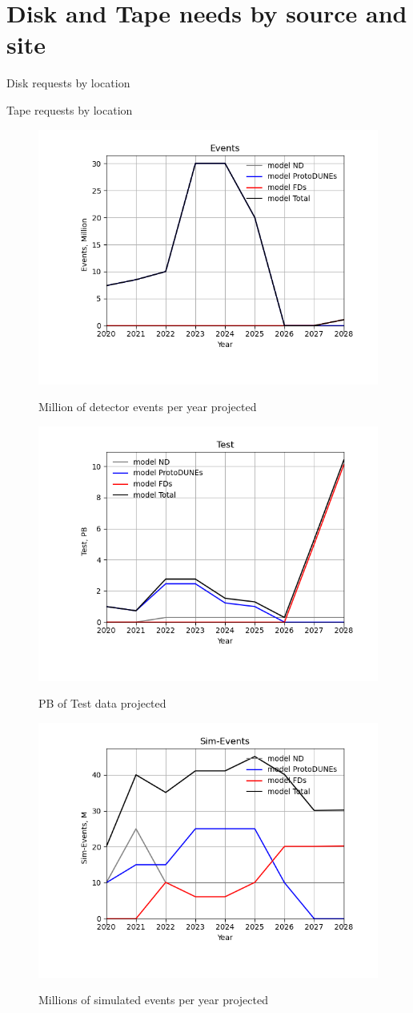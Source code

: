 \documentclass[12pt,landscape]{article}
\begin{document}
\section{Disk and Tape needs by source and site}\begin{table}[h]
\centering{}\label{Cumulative-Disk
}
\caption{Disk requests by location}
\end{table}
\begin{table}[h]
\centering{}\label{Cumulative-Tape
}
\caption{Tape requests by location}
\end{table}
\begin{figure}[ht]
\centering\includegraphics[height=0.4\textwidth]{report/Parameters_2022-11-07-2028-Events.png}\label{Events}
\caption{Million of detector events per year projected}
\end{figure}
\begin{figure}[ht]
\centering\includegraphics[height=0.4\textwidth]{report/Parameters_2022-11-07-2028-Test.png}\label{Test}
\caption{PB of Test data projected}
\end{figure}
\begin{figure}[ht]
\centering\includegraphics[height=0.4\textwidth]{report/Parameters_2022-11-07-2028-Sim-Events.png}\label{Sim-Events}
\caption{Millions of simulated events per year projected}
\end{figure}
\end{document}
